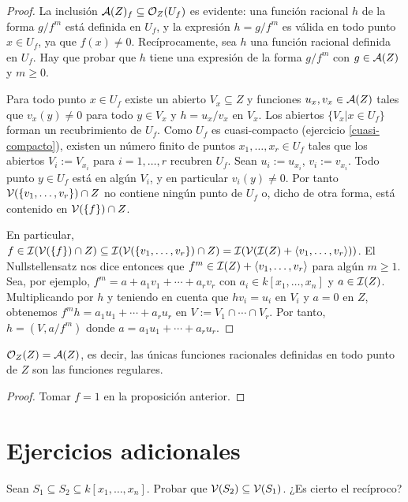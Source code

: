 \documentclass[ACGA.tex]{subfiles}
\begin{document}
\begin{proof}
 La inclusión $\mathcal{A}(Z)_f\subseteq{\mathcal O}_Z(U_f)$ es evidente: una función racional $h$ de la forma $g/f^m$ está definida en $U_f$, y la expresión $h=g/f^m$ es válida en todo punto $x\in U_f$, ya que $f(x)\neq 0$. Recíprocamente, sea $h$ una función racional definida en $U_f$. Hay que probar que $h$ tiene una expresión de la forma $g/f^m$ con $g\in\mathcal{A}(Z)$ y $m\geq 0$.

Para todo punto $x\in U_f$ existe un abierto $V_x\subseteq Z$ y funciones $u_x,v_x\in\mathcal{A}(Z)$ tales que $v_x(y)\neq 0$ para todo $y\in V_x$ y $h=u_x/v_x$ en $V_x$. Los abiertos $\{V_x|x\in U_f\}$ forman un recubrimiento de $U_f$. Como $U_f$ es cuasi-compacto (ejercicio \ref{cuasi-compacto}), existen un número finito de puntos $x_1,\ldots,x_r\in U_f$ tales que los abiertos $V_i:=V_{x_i}$ para $i=1,\ldots,r$ recubren $U_f$. Sean $u_i:=u_{x_i}$, $v_i:=v_{x_i}$. Todo punto $y\in U_f$ está en algún $V_i$, y en particular $v_i(y)\neq 0$. Por tanto $\mathcal{V}(\{v_1,\ldots,v_r\})\cap Z$ no contiene ningún punto de $U_f$ o, dicho de otra forma, está contenido en $\mathcal{V}(\{f\})\cap Z$. 

 En particular, $f\in\mathcal{I}(\mathcal{V}(\{f\})\cap Z)\subseteq\mathcal{I}(\mathcal{V}(\{v_1,\ldots,v_r\})\cap Z)=\mathcal{I}(\mathcal{V}(\mathcal{I}(Z)+\langle v_1,\ldots,v_r\rangle))$. El Nullstellensatz nos dice entonces que $f^m\in\mathcal{I}(Z)+\langle v_1,\ldots,v_r\rangle$ para algún $m\geq 1$. Sea, por ejemplo, $f^m=a+a_1v_1+\cdots+a_rv_r$ con $a_i\in k[x_1,\ldots,x_n]$ y $a\in\mathcal{I}(Z)$. Multiplicando por $h$ y teniendo en cuenta que $hv_i=u_i$ en $V_i$ y $a=0$ en $Z$, obtenemos $f^mh=a_1u_1+\cdots+a_ru_r$ en $V:=V_1\cap\cdots\cap V_r$. Por tanto, $h=(V,a/f^m)$ donde $a=a_1u_1+\cdots+a_ru_r$.
\end{proof}


\begin{coro}\label{definidatodopunto}
 ${\mathcal O}_Z(Z)=\mathcal{A}(Z)$, es decir, las únicas funciones racionales definidas en todo punto de $Z$ son las funciones regulares.
\end{coro}

\begin{proof}
 Tomar $f=1$ en la proposición anterior.
\end{proof}


\section{Ejercicios adicionales}
 
\begin{ejer}\label{contencion} Sean $S_1\subseteq S_2\subseteq k[x_1,\ldots,x_n]$. Probar que $\mathcal{V}(S_2)\subseteq \mathcal{V}(S_1)$. ¿Es cierto el recíproco?
 
\end{ejer}
\end{document}
